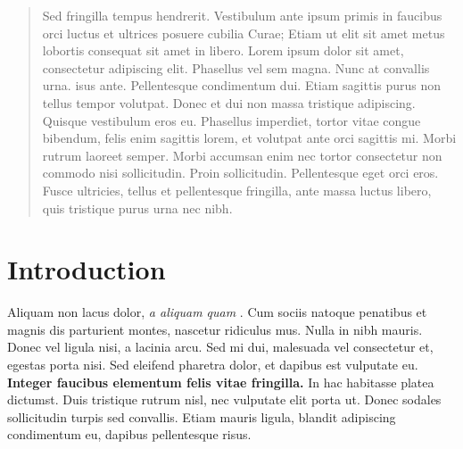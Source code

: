 \documentclass[a0,portrait]{a0poster}
\begin{document}
\begin{multicols}{2} %


\color{Navy} %

\begin{abstract}

Sed fringilla tempus hendrerit. Vestibulum\cite{1391010} ante ipsum primis in faucibus orci luctus et ultrices posuere cubilia Curae; Etiam ut elit sit amet metus lobortis consequat sit amet in libero. Lorem ipsum dolor sit amet, consectetur adipiscing elit. Phasellus vel sem magna. Nunc at convallis urna. isus ante. Pellentesque condimentum dui. Etiam sagittis purus non tellus tempor volutpat. Donec et dui non massa tristique adipiscing. Quisque vestibulum eros eu. Phasellus imperdiet, tortor vitae congue bibendum, felis enim sagittis lorem, et volutpat ante orci sagittis mi. Morbi rutrum laoreet semper. Morbi accumsan enim nec tortor consectetur non commodo nisi sollicitudin. Proin sollicitudin. Pellentesque eget orci eros. Fusce ultricies, tellus et pellentesque fringilla, ante massa luctus libero, quis tristique purus urna nec nibh.

\end{abstract}


\color{SaddleBrown} %

\section*{Introduction}

Aliquam non lacus dolor, \textit{a aliquam quam} \cite{Smith:2012qr}. Cum sociis natoque penatibus et magnis dis parturient montes, nascetur ridiculus mus. Nulla in nibh mauris. Donec vel ligula nisi, a lacinia arcu. Sed mi dui, malesuada vel consectetur et, egestas porta nisi. Sed eleifend pharetra dolor, et dapibus est vulputate eu. \textbf{Integer faucibus elementum felis vitae fringilla.} In hac habitasse platea dictumst. Duis tristique rutrum nisl, nec vulputate elit porta ut. Donec sodales sollicitudin turpis sed convallis. Etiam mauris ligula, blandit adipiscing condimentum eu, dapibus pellentesque risus.


\end{multicols}
\end{document}
